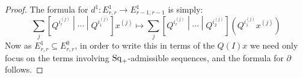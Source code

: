 \documentclass[10pt]{article}
\newcommand{\nontop}[1]{\ifblank{#1}{\scrU}{\scrU^{#1}}}
\newcommand{\Boverline}{\smash{\overline{B}}\rule{0mm}{\heightof{\ensuremath{B}}}}
\newcommand{\Koverline}{\smash{\overline{K}}\rule{0mm}{\heightof{\ensuremath{K}}}}
\newcommand{\Ind}[2][]{\ifblank{#1}{\mathbf{I}^{\smash{\mbox{\tiny $#2$}}}}{\mathbf{I}^{\mbox{\tiny $#2$}}_{#1}}}%
\newcommand{\derived}{\mathbb{L}}
\renewcommand{\Q}{Q}
\newcommand{\SqShift}{\Sq_{\smash{+}}}
\newcommand{\Sq}{\mathrm{Sq}}
\begin{document}
\begin{KoszulComplexes_n>1}
\begin{proof}


The formula for $d^1:E^1_{r,r}\to E^1_{r-1,r-1}$ is simply:
\[\sum_j \left[\Q^{i_r^{(j)}}\middle|\cdots \middle|\Q^{i_1^{(j)}}\right]x^{(j)}
\mapsto
\sum_j \left[\Q^{i_r^{(j)}}\middle|\cdots \middle|\Q^{i_2^{(j)}}\right]\left(\Q^{i_1^{(j)}}x^{(j)}\right)\]
Now as $E^1_{r,r}\subseteq E^0_{r,r}$, in order to write this in terms of the $\Q(I)x$ we need only focus on the terms involving $\SqShift$-admissible sequences, and the formula for $\partial$ follows.
\end{proof}


\end{KoszulComplexes_n>1}
\end{document}
